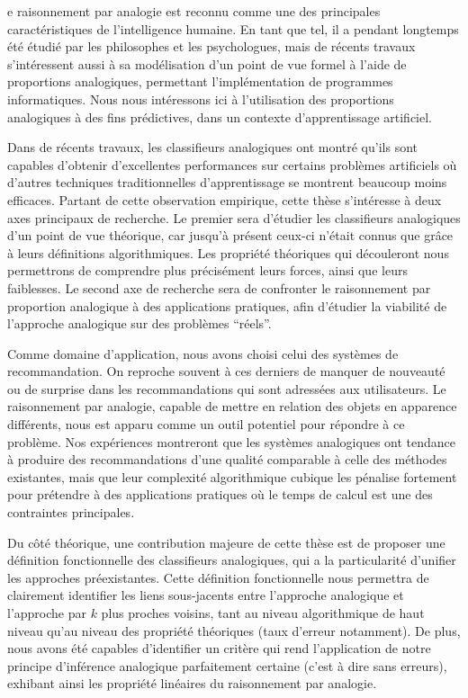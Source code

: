 e raisonnement par analogie est reconnu comme une des principales
caractéristiques de l'intelligence humaine. En tant que tel, il a pendant
longtemps été étudié par les philosophes et les psychologues, mais de récents
travaux s'intéressent aussi à sa modélisation d'un point de vue formel à l'aide
de proportions analogiques, permettant l'implémentation de programmes
informatiques. Nous nous intéressons ici à l'utilisation des proportions
analogiques à des fins prédictives, dans un contexte d'apprentissage
artificiel.

Dans de récents travaux, les classifieurs analogiques ont montré qu'ils sont
capables d'obtenir d'excellentes performances sur certains problèmes
artificiels où d'autres techniques traditionnelles d'apprentissage se montrent
beaucoup moins efficaces. Partant de cette observation empirique, cette thèse
s'intéresse à deux axes principaux de recherche. Le premier sera d'étudier les
classifieurs analogiques d'un point de vue théorique, car jusqu'à présent
ceux-ci n'était connus que grâce à leurs définitions algorithmiques. Les
propriété théoriques qui découleront nous permettrons de comprendre plus
précisément leurs forces, ainsi que leurs faiblesses. Le second axe de
recherche sera de confronter le raisonnement par proportion analogique à des
applications pratiques, afin d'étudier la viabilité de l'approche analogique
sur des problèmes ``réels''.

Comme domaine d'application, nous avons choisi celui des systèmes de
recommandation. On reproche souvent à ces derniers de manquer de nouveauté ou
de surprise dans les recommandations qui sont adressées aux utilisateurs. Le
raisonnement par analogie, capable de mettre en relation des objets en
apparence différents, nous est apparu comme un outil potentiel pour répondre à
ce problème. Nos expériences montreront que les systèmes analogiques ont
tendance à produire des recommandations d'une qualité comparable à celle des
méthodes existantes, mais que leur complexité algorithmique cubique les
pénalise fortement pour prétendre à des applications pratiques où le temps de
calcul est une des contraintes principales.

Du côté théorique, une contribution majeure de cette thèse est de proposer une
définition fonctionnelle des classifieurs analogiques, qui a la particularité
d'unifier les approches préexistantes. Cette définition fonctionnelle nous
permettra de clairement identifier les liens sous-jacents entre l'approche
analogique et l'approche par $k$ plus proches voisins, tant au niveau
algorithmique de haut niveau qu'au niveau des propriété théoriques (taux
d'erreur notamment). De plus, nous avons été capables d'identifier un critère
qui rend l'application de notre principe d'inférence analogique parfaitement
certaine (c'est à dire sans erreurs),  exhibant ainsi les propriété linéaires
du raisonnement par analogie.

